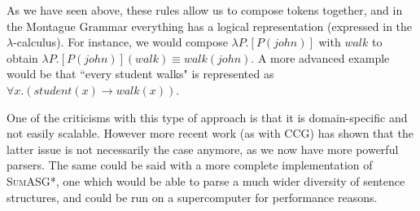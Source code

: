 As we have seen above, these rules allow us to compose tokens together, and in the Montague Grammar everything has a logical representation (expressed in the $\lambda$-calculus). For instance, we would compose $\lambda P.[P(john)]$ with $walk$ to obtain $\lambda P.[P(john)](walk) \equiv walk(john)$. A more advanced example would be that ``every student walks" is represented as $\forall x.(student(x) \to walk(x))$.

\mbox{}

One of the criticisms with this type of approach \cite{clark_combining_nodate} is that it is domain-specific and not easily scalable. However more recent work (as with CCG) has shown that the latter issue is not necessarily the case anymore, as we now have more powerful parsers. The same could be said with a more complete implementation of \textsc{SumASG*}, one which would be able to parse a much wider diversity of sentence structures, and could be run on a supercomputer for performance reasons.